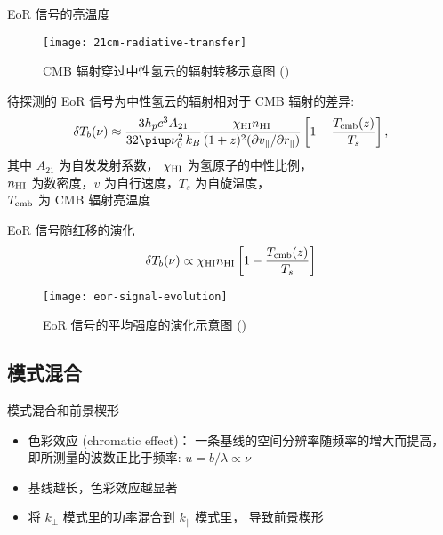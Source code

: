 \documentclass{beamer}
\begin{document}
\begin{frame}{EoR 信号的亮温度}
  \begin{figure}
    \centering
    \texttt{[image: 21cm-radiative-transfer]}
    \caption{CMB 辐射穿过中性氢云的辐射转移示意图 (\cite{zaroubi2013})}
  \end{figure}

  待探测的 \alert{EoR 信号}为中性氢云的辐射相对于 CMB 辐射的\alert{差异}:
  \begin{equation}
    \delta T_b(\nu) \approx
      \frac{3 h_p c^3 A_{21}}{32\Cpi \nu_0^2 \,k_B}
      \frac{\chi_{\R{HI}} n_{\R{HI}}}{
        (1+z)^2 (\partial v_{\parallel} / \partial r_{\parallel})}
      \left[ 1 - \frac{T_{\R{cmb}}(z)}{T_s} \right] ,
  \end{equation}
  其中 $A_{21}$ 为自发发射系数，
  $\chi_{\text{HI}}$ 为氢原子的中性比例， \\
  $n_{\text{HI}}$ 为数密度，$v$ 为自行速度，$T_s$ 为自旋温度，\\
  $T_{\text{cmb}}$ 为 CMB 辐射亮温度
\end{frame}

\begin{frame}{EoR 信号随红移的演化}
  \begin{equation}
    \delta T_b(\nu) \propto
      \chi_{\text{HI}} n_{\text{HI}}
      \left[ 1 - \frac{T_{\text{cmb}}(z)}{T_s} \right]
  \end{equation}
  \begin{figure}
    \centering
    \texttt{[image: eor-signal-evolution]}
    \caption{EoR 信号的平均强度的演化示意图 (\cite{pritchard2012})}
  \end{figure}
\end{frame}

\subsection{模式混合}

\begin{frame}{模式混合和前景楔形}
  \begin{itemize}
    \item \alert{色彩效应 (chromatic effect)}：
      一条基线的空间分辨率随频率的增大而提高，
      即所测量的波数正比于频率: $u = b/\lambda \propto \nu$
    \item 基线越长，色彩效应越显著
    \item 将 $k_{\perp}$ 模式里的功率\alert{混合}到 $k_{\parallel}$ 模式里，
      导致\alert{前景楔形}
  \end{itemize}

  \vspace{-1ex}
\end{frame}
\end{document}
